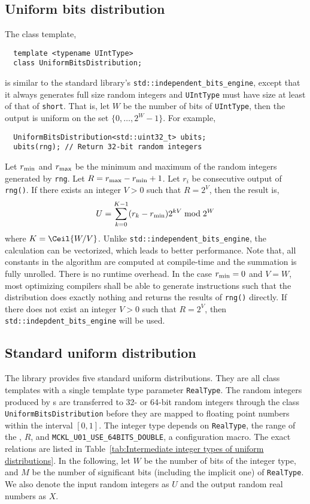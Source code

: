 \subsection{Uniform bits distribution}
\label{sub:Uniform bits distribution}

The class template,
\begin{Verbatim}
  template <typename UIntType>
  class UniformBitsDistribution;
\end{Verbatim}
is similar to the standard library's \verb|std::independent_bits_engine|,
except that it always generates full size random integers and \verb|UIntType|
must have size at least of that of \verb|short|. That is, let $W$ be the number
of bits of \verb|UIntType|, then the output is uniform on the set
$\{0,\dots,2^W - 1\}$. For example,
\begin{Verbatim}
  UniformBitsDistribution<std::uint32_t> ubits;
  ubits(rng); // Return 32-bit random integers
\end{Verbatim}
Let $r_{\mathrm{min}}$ and $r_{\mathrm{max}}$ be the minimum and maximum of the random integers
generated by \verb|rng|. Let $R = r_{\mathrm{max}} - r_{\mathrm{min}} + 1$. Let $r_i$ be consecutive
output of \verb|rng()|. If there exists an integer $V > 0$ such that $R = 2^V$,
then the result is,
\begin{equation*}
  U = \sum_{k = 0}^{K - 1} (r_k - r_{\mathrm{min}}) 2^{kV} \bmod 2^W
\end{equation*}
where $K = \Ceil{W / V}$. Unlike \verb|std::independent_bits_engine|, the
calculation can be vectorized, which leads to better performance. Note that,
all constants in the algorithm are computed at compile-time and the summation
is fully unrolled. There is no runtime overhead. In the case $r_{\mathrm{min}} = 0$ and $V
= W$, most optimizing compilers shall be able to generate instructions such
that the distribution does exactly nothing and returns the results of
\verb|rng()| directly. If there does not exist an integer $V > 0$ such that $R
= 2^V$, then \verb|std::indepdent_bits_engine| will be used.

\subsection{Standard uniform distribution}
\label{sub:Standard uniform distribution}

The library provides five standard uniform distributions. They are all class
templates with a single template type parameter \verb|RealType|. The random
integers produced by \rng{}s are transferred to 32- or 64-bit random integers
through the class \verb|UniformBitsDistribution| before they are mapped to
floating point numbers within the interval $[0, 1]$. The integer type depends
on \verb|RealType|, the range of the \rng{}, $R$, and
\verb|MCKL_U01_USE_64BITS_DOUBLE|, a configuration macro. The exact relations
are listed in Table~\ref{tab:Intermediate integer types of uniform
  distributions}. In the following, let $W$ be the number of bits of the
integer type, and $M$ be the number of significant bits (including the implicit
one) of \verb|RealType|. We also denote the input random integers as $U$ and
the output random real numbers as $X$.

